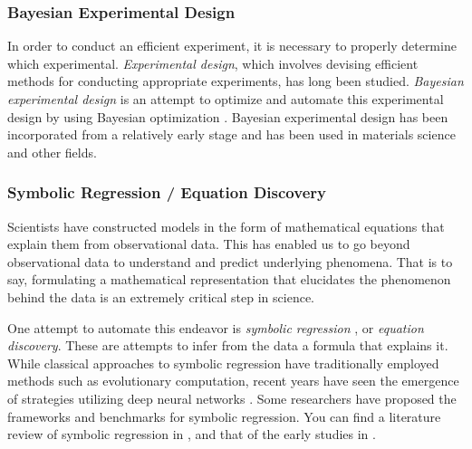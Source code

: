 \subsubsection{Bayesian Experimental Design}
In order to conduct an efficient experiment, it is necessary to properly determine which experimental. \textit{Experimental design}, which involves devising efficient methods for conducting appropriate experiments, has long been studied. \textit{Bayesian experimental design} is an attempt to optimize and automate this experimental design by using Bayesian optimization \cite{chaloner1995bayesian,shahriari2015taking}. Bayesian experimental design has been incorporated from a relatively early stage and has been used in materials science and other fields.


\subsubsection{Symbolic Regression / Equation Discovery}
Scientists have constructed models in the form of mathematical equations that explain them from observational data. This has enabled us to go beyond observational data to understand and predict underlying phenomena. That is to say, formulating a mathematical representation that elucidates the phenomenon behind the data is an extremely critical step in science. 


One attempt to automate this endeavor is \textit{symbolic regression} \cite{makke2022interpretable}, or \textit{equation discovery}. These are attempts to infer from the data a formula that explains it. While classical approaches to symbolic regression have traditionally employed methods such as evolutionary computation, recent years have seen the emergence of strategies utilizing deep neural networks \cite{petersen2019deep,udrescu2020ai,udrescu2020ai2,cranmer2020discovering,kamienny2022end,d2022deep}. Some researchers have proposed the frameworks \cite{landajuela2022unified,keren2023computational} and benchmarks \cite{matsubara2022rethinking} for symbolic regression. You can find a literature review of symbolic regression in \cite{makke2022interpretable}, and that of the early studies in \cite{kramer2023automated}.


